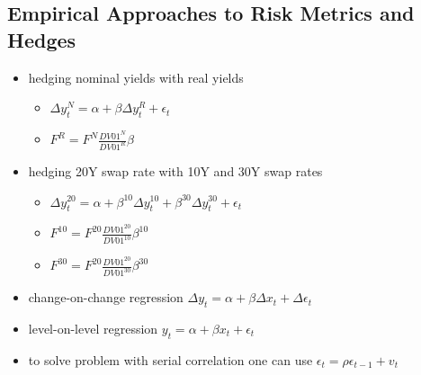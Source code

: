 \subsection{Empirical Approaches to Risk Metrics and Hedges}
\begin{itemize}
	\item hedging nominal yields with real yields
	\begin{itemize}
		\item $\Delta y_t^N = \alpha + \beta \Delta y_t^R + \epsilon_t$
		\item $F^R = F^N \frac{DV01^N}{DV01^R}\beta$
	\end{itemize}
	\item hedging 20Y swap rate with 10Y and 30Y swap rates
	\begin{itemize}
		\item $\Delta y_t^{20} = \alpha + \beta^{10} \Delta y_t^{10} + \beta^{30} \Delta y_t^{30} + \epsilon_t$
		\item $F^{10} = F^{20} \frac{DV01^{20}}{DV01^{10}} \beta^{10}$
		\item $F^{30} = F^{20} \frac{DV01^{20}}{DV01^{30}} \beta^{30}$
	\end{itemize}
	\item change-on-change regression $\Delta y_t = \alpha + \beta \Delta x_t + \Delta \epsilon_t$
	\item level-on-level regression $y_t = \alpha + \beta x_t + \epsilon_t$
	\item to solve problem with serial correlation one can use $\epsilon_t = \rho \epsilon_{t - 1} + v_t$
\end{itemize}

